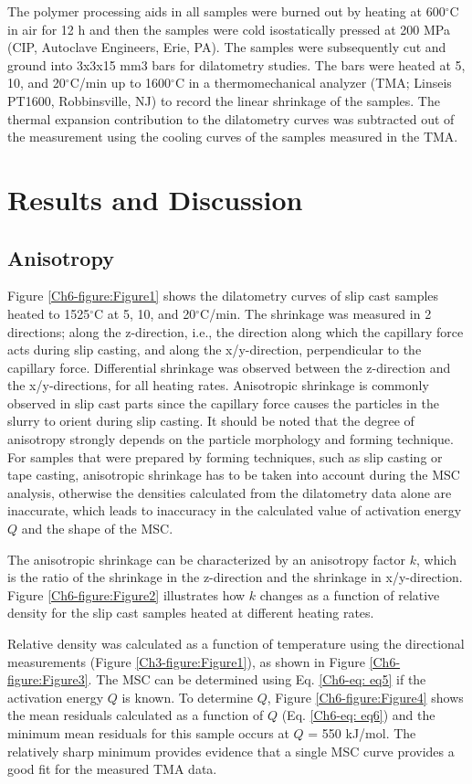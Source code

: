 The polymer processing aids in all samples were burned out by heating at 600$^{\circ}$C in air for 12 h and then the samples were cold isostatically pressed at 200 MPa (CIP, Autoclave Engineers, Erie, PA). The samples were subsequently cut and ground into 3x3x15 mm3 bars for dilatometry studies. The bars were heated at 5, 10, and 20$^{\circ}$C/min up to 1600$^{\circ}$C in a thermomechanical analyzer (TMA; Linseis PT1600, Robbinsville, NJ) to record the linear shrinkage of the samples. The thermal expansion contribution to the dilatometry curves was subtracted out of the measurement using the cooling curves of the samples measured in the TMA.

\section{Results and Discussion}

\subsection{Anisotropy}
Figure \ref{Ch6-figure:Figure1} shows the dilatometry curves of slip cast samples heated to 1525$^{\circ}$C at 5, 10, and 20$^{\circ}$C/min. The shrinkage was measured in 2 directions; along the z-direction, i.e., the direction along which the capillary force acts during slip casting, and along the x/y-direction, perpendicular to the capillary force. Differential shrinkage was observed between the z-direction and the x/y-directions, for all heating rates. Anisotropic shrinkage is commonly observed in slip cast parts since the capillary force causes the particles in the slurry to orient during slip casting. It should be noted that the degree of anisotropy strongly depends on the particle morphology and forming technique. For samples that were prepared by forming techniques, such as slip casting or tape casting, anisotropic shrinkage has to be taken into account during the MSC analysis, otherwise the densities calculated from the dilatometry data alone are inaccurate, which leads to inaccuracy in the calculated value of activation energy $Q$ and the shape of the MSC. 

The anisotropic shrinkage can be characterized by an anisotropy factor $k$, which is the ratio of the shrinkage in the z-direction and the shrinkage in x/y-direction. Figure \ref{Ch6-figure:Figure2} illustrates how $k$ changes as a function of relative density for the slip cast samples heated at different heating rates. 

Relative density was calculated as a function of temperature using the directional measurements (Figure \ref{Ch3-figure:Figure1}), as shown in Figure \ref{Ch6-figure:Figure3}. The MSC can be determined using Eq. \ref{Ch6-eq: eq5} if the activation energy $Q$ is known. To determine $Q$, Figure \ref{Ch6-figure:Figure4} shows the mean residuals calculated as a function of $Q$ (Eq. \ref{Ch6-eq: eq6}) and the minimum mean residuals for this sample occurs at $Q$ = 550 kJ/mol. The relatively sharp minimum provides evidence that a single MSC curve provides a good fit for the measured TMA data. 

